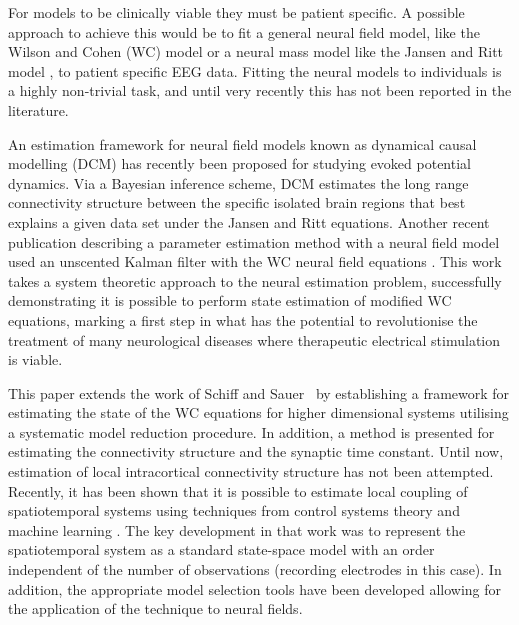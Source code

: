 \documentclass[12pt]{iopart}
\begin{document}
For models to be clinically viable they must be patient specific. A possible approach to achieve this would be to fit a general neural field model, like the Wilson and Cohen (WC) \cite{Wilson1973} model or a neural mass model like the Jansen and Ritt model \cite{Jansen1995}, to patient specific EEG data. Fitting the neural models to individuals is a highly non-trivial task, and until very recently this has not been reported in the literature. 

An estimation framework for neural field models known as dynamical causal modelling (DCM) \cite{David2003,David2006} has recently been proposed for studying evoked potential dynamics. Via a Bayesian inference scheme, DCM estimates the long range connectivity structure between the specific isolated brain regions that best explains a given data set under the Jansen and Ritt equations. Another recent publication describing a parameter estimation method with a neural field model used an unscented Kalman filter with the WC neural field equations \cite{schiff2008kalman}. This work takes a system theoretic approach to the neural estimation problem, successfully demonstrating it is possible to perform state estimation of modified WC equations, marking a first step in what has the potential to revolutionise the treatment of many neurological diseases where therapeutic electrical stimulation is viable.


This paper extends the work of Schiff and Sauer~\cite{schiff2008kalman} by establishing a framework for estimating the state of the WC equations for higher dimensional systems utilising a systematic model reduction procedure. In addition, a method is presented for estimating the connectivity structure and the synaptic time constant. Until now, estimation of local intracortical connectivity structure has not been attempted. Recently, it has been shown that it is possible to estimate local coupling of spatiotemporal systems using techniques from control systems theory and machine learning \cite{Dewar2009}. The key development in that work was to represent the spatiotemporal system as a standard state-space model with an order independent of the number of observations (recording electrodes in this case). In addition, the appropriate model selection tools have been developed \cite{Scerri2009} allowing for the application of the technique to neural fields. 
\end{document}
